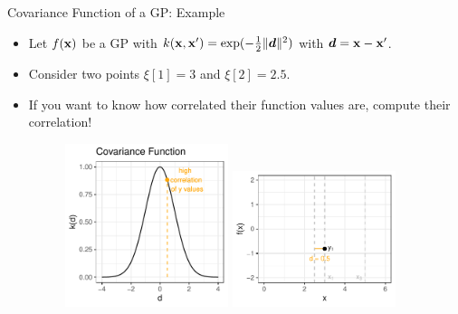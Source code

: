 \documentclass[11pt,compress,t,notes=noshow, xcolor=table]{beamer}
\begin{document}
\begin{frame}{Covariance Function of a GP: Example} 

\begin{itemize}
  \item Let $f(\mathbf{x})$ be a GP with $k(\mathbf{x}, \mathbf{x}^\prime) = \exp(-\frac{1}{2}\|\bm{d}\|^2)$ with $\bm{d} = \mathbf{x} - \mathbf{x}^\prime$.
  \item Consider two points $\xi[1] = 3$ and $\xi[2] = 2.5$. 
  \item If you want to know how correlated their function values are, compute their correlation!
    \begin{figure}
      \includegraphics[width=0.45\textwidth]{figure/covariance2point/example_covariance_1.pdf}
      \includegraphics[width=0.45\textwidth]{figure/covariance2point/example_function_1_1.pdf}
    \end{figure}
\end{itemize}

\end{frame}
\end{document}

